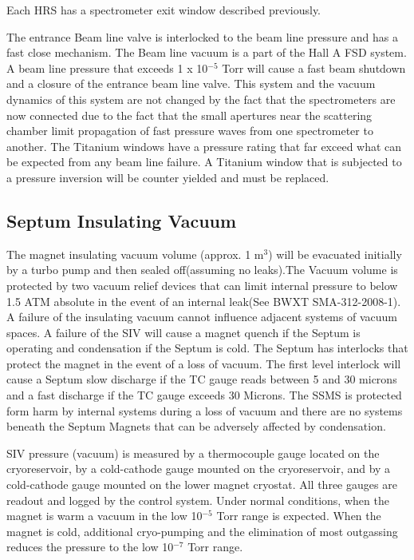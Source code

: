 {Each HRS has a spectrometer exit window described previously.

The entrance Beam line valve is interlocked to the beam line pressure and has a fast 
close mechanism. The Beam line vacuum is a part of the Hall A FSD system. A beam line 
pressure that exceeds 1 x 10$^{-5}$ Torr will cause a fast beam shutdown and a closure 
of the entrance beam line valve. This system and the vacuum dynamics of this system 
are not changed by the fact that the spectrometers are now connected due to the fact 
that the small apertures near the scattering chamber limit propagation of fast pressure 
waves from one spectrometer to another. The Titanium windows have a pressure rating that 
far exceed what can be expected from any beam line failure. A Titanium window that is 
subjected to a pressure inversion will be counter yielded and must be replaced.


\subsection {\bf Septum Insulating Vacuum}


The magnet insulating vacuum volume (approx. 1 m$^3$) will be evacuated initially by a 
turbo pump and then sealed off(assuming no leaks).The Vacuum volume is protected by 
two vacuum relief devices that can limit internal pressure to below 1.5 ATM absolute 
in the event of an internal leak(See BWXT SMA-312-2008-1). A failure of the insulating 
vacuum cannot influence adjacent systems of vacuum spaces. A failure of the SIV will 
cause a magnet quench if the Septum is operating and condensation if the Septum is cold. 
The Septum has interlocks that protect the magnet in the event of a loss of vacuum. The 
first level interlock will cause a Septum slow discharge if the TC gauge reads between 
5 and 30 microns and a fast discharge if the TC gauge exceeds 30 Microns. The SSMS is 
protected form harm by internal systems during a loss of vacuum and there are no systems 
beneath the Septum Magnets  that can be adversely affected by condensation.

 SIV pressure (vacuum) is measured by a thermocouple gauge located on the cryoreservoir, 
by a cold-cathode gauge mounted on the cryoreservoir, and by a cold-cathode gauge mounted 
on the lower magnet cryostat. All three gauges are readout and logged by the control system.  
Under normal conditions, when the magnet is warm a vacuum in the low 10$^{-5}$ Torr range is 
expected.  When the magnet is cold, additional cryo-pumping and the elimination of most 
outgassing reduces the pressure to the low 10$^{-7}$ Torr range.

}
